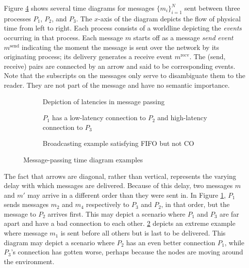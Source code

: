 \documentclass[]             %
{NASA}                       %
\theoremstyle{definition}
\begin{document}
Figure \ref{fig:message-latencies} shows several time diagrams for
messages $\{m_i\}_{i=1}^N$ sent between three processes $P_1$, $P_2$,
and $P_3$. The $x$-axis of the diagram depicts the flow of physical
time from left to right. Each process consists of a worldline
depicting the \emph{events} occurring in that process. Each message
$m$ starts off as a message \emph{send event} $m^\textrm{send}$
indicating the moment the message is sent over the network by its
originating process; its delivery generates a receive event
$m^\textrm{recv}$. The (send, receive) pairs are connected by an arrow
and said to be corresponding events. Note that the subscripts on the
messages only serve to disambiguate them to the reader. They are not
part of the message and have no semantic importance.

\begin{figure}[p]
  \setlength\belowcaptionskip{5ex}

  \begin{subfigure}{1\textwidth}
    \centering
    
    \caption{Depiction of latencies in message passing}
    \label{fig:message-latencies-a}
  \end{subfigure}

  \begin{subfigure}{1\textwidth}
    \centering 
    \caption{$P_1$ has a low-latency connection to $P_2$ and high-latency connection to $P_3$}
    \label{fig:message-latencies-b}
  \end{subfigure}


  \begin{subfigure}{1\textwidth}
    \centering 
    \caption{Broadcasting example satisfying FIFO but not CO}
    \label{fig:message-latencies-c}
  \end{subfigure}

  \caption{Message-passing time diagram examples}
  \label{fig:message-latencies}
\end{figure}

\afterpage{\clearpage}

The fact that arrows are diagonal, rather than vertical, represents
the varying delay with which messages are delivered. Because of this
delay, two messages $m$ and $m'$ may arrive in a different order than
they were sent in. In Figure \ref{fig:message-latencies-a}, $P_1$
sends messages $m_2$ and $m_4$ respectively to $P_3$ and $P_2$, in
that order, but the message to $P_2$ arrives first. This may depict a
scenario where $P_1$ and $P_3$ are far apart and have a bad connection
to each other. \ref{fig:message-latencies-b} depicts an extreme
example where message $m_1$ is sent before all others but is last to
be delivered. This diagram may depict a scenario where $P_2$ has an
even better connection $P_1$, while $P_3$'s connection has gotten
worse, perhaps because the nodes are moving around the environment.
\end{document}
